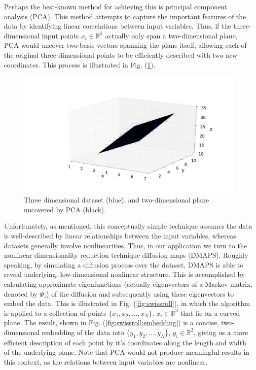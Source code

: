 \documentclass[11pt]{article}
\begin{document}
Perhaps the best-known method for achieving this is principal component analysis (PCA). This method attempts to capture the important features of the data by identifying linear correlations between input variables. Thus, if the three-dimensional input points $x_i \in \mathbb{R}^3$ actually only span a two-dimensional plane, PCA would uncover two basis vectors spanning the plane itself, allowing each of the original three-dimensional points to be efficiently described with two new coordinates. This process is illustrated in Fig. (\ref{fig:pca}).

\begin{figure}[!h]

  \begin{center}
    \includegraphics[width=1.0\textwidth]{pca_combined}
    \caption{Three dimensional dataset (blue), and two-dimensional plane uncovered by PCA (black).}
    \label{fig:pca}
  \end{center}

\end{figure}

Unfortunately, as mentioned, this conceptually simple technique assumes the data is well-described by linear relationships between the input variables, whereas datasets generally involve nonlinearities. Thus, in our application we turn to the nonlinear dimensionality reduction technique diffusion maps (DMAPS). Roughly speaking, by simulating a diffusion process over the dataset, DMAPS is able to reveal underlying, low-dimensional nonlinear structure. This is accomplished by calculating approximate eigenfunctions (actually eigenvectors of a Markov matrix, denoted by $\Phi_i$) of the diffusion and subsequently using these eigenvectors to embed the data. This is illustrated in Fig. (\ref{fig:swissroll}), in which the algorithm is applied to a collection of points $\{x_1, x_2, ..., x_N\}$, $x_i \in \mathbb{R}^3$ that lie on a curved plane. The result, shown in Fig. (\ref{fig:swissroll:embedding}) is a concise, two-dimensional embedding of the data into $\{y_1, y_2, ..., y_N\}$, $y_i \in \mathbb{R}^2$, giving us a more efficient description of each point by it's coordinates along the length and width of the underlying plane. Note that PCA would not produce meaningful results in this context, as the relations between input variables are nonlinear.
\end{document}
